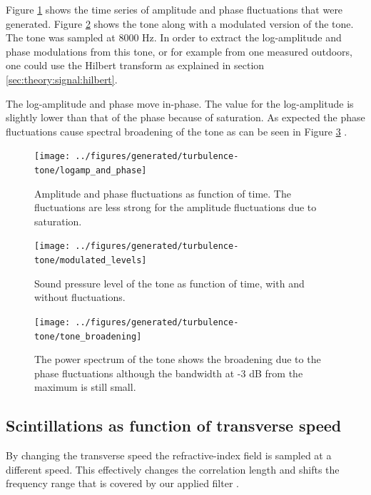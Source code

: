 Figure \ref{fig:results_tone_logamp_and_phase} shows the time series of
amplitude and phase fluctuations that were generated. Figure
\ref{fig:results_tone_levels} shows the tone along with a modulated version of
the tone. The tone was sampled at 8000 Hz. In order to extract the log-amplitude and phase
modulations from this tone, or for example from one measured outdoors, one could use the Hilbert transform as explained
in section \ref{sec:theory:signal:hilbert}.

The log-amplitude and phase move in-phase. The value for the log-amplitude is slightly lower than that of the phase because of saturation.
As expected the phase fluctuations cause spectral broadening of the tone as can be seen in Figure \ref{fig:results_tone_broadening} \cite{Ostashev2016}.

\begin{figure}[H]
  \centering
  \texttt{[image: ../figures/generated/turbulence-tone/logamp\_and\_phase]}
  \caption{Amplitude and phase fluctuations as function of time. The fluctuations are less strong for the amplitude fluctuations due to saturation.}
  \label{fig:results_tone_logamp_and_phase}
\end{figure}

\begin{figure}[H]
  \centering
  \texttt{[image: ../figures/generated/turbulence-tone/modulated\_levels]}
  \caption{Sound pressure level of the tone as function of time, with and without fluctuations.}
  \label{fig:results_tone_levels}
\end{figure}



\begin{figure}[H]
  \centering
  \texttt{[image: ../figures/generated/turbulence-tone/tone\_broadening]}
  \caption{The power spectrum of the tone shows the broadening due to the phase fluctuations although the bandwidth at -3 dB from the maximum is still small.}
  \label{fig:results_tone_broadening}
\end{figure}

\subsection{Scintillations as function of transverse speed}
By changing the transverse speed the refractive-index field is sampled at a
different speed. This effectively changes the correlation length and shifts the frequency range that is covered by our applied filter \cite{Wilson1999}.


